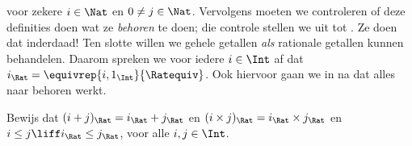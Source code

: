 \documentclass[openany]{memoir}
\begin{document}
voor zekere $i \in \Nat$ en $0 \neq j \in \Nat$.
Vervolgens moeten we controleren of deze definities doen wat ze
\emph{behoren} te doen; die controle stellen we uit tot .
Ze doen dat inderdaad!{} Ten slotte willen we gehele getallen \emph{als}
rationale getallen kunnen behandelen. Daarom spreken we voor iedere
$i \in \Int$ af dat $i_\Rat = \equivrep{i, 1_\Int}{\Ratequiv}$. Ook hiervoor
gaan we in  na dat alles naar behoren werkt.
\begin{prob}
Bewijs dat $(i + j)_\Rat = i_\Rat+ j_\Rat$ en $(i \times j)_\Rat =
i_\Rat \times j_\Rat$ en $i \leq j \liff i_\Rat \leq j_\Rat$, voor alle
$i, j \in \Int$.
\end{prob}
\endgroup

\begingroup
\def\olfilename{OLP-0044}
\def\olfilepath{content/sets-functions-relations/arithmetization/}
\hypertarget{unit-OLP-0044}{}
\end{document}
